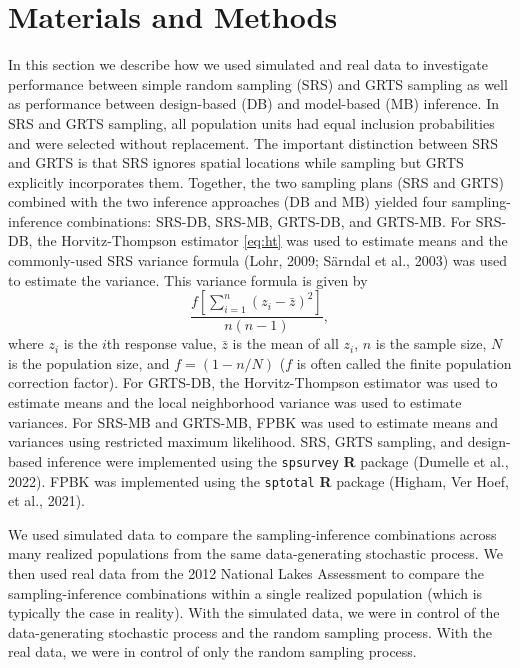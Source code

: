 \documentclass[]{elsarticle} %
\begin{document}
\hypertarget{sec:mm}{%
\section{Materials and Methods}\label{sec:mm}}

In this section we describe how we used simulated and real data to
investigate performance between simple random sampling (SRS) and GRTS
sampling as well as performance between design-based (DB) and
model-based (MB) inference. In SRS and GRTS sampling, all population
units had equal inclusion probabilities and were selected without
replacement. The important distinction between SRS and GRTS is that SRS
ignores spatial locations while sampling but GRTS explicitly
incorporates them. Together, the two sampling plans (SRS and GRTS)
combined with the two inference approaches (DB and MB) yielded four
sampling-inference combinations: SRS-DB, SRS-MB, GRTS-DB, and GRTS-MB.
For SRS-DB, the Horvitz-Thompson estimator \eqref{eq:ht} was used to
estimate means and the commonly-used SRS variance formula (Lohr, 2009;
Särndal et al., 2003) was used to estimate the variance. This variance
formula is given by \begin{equation}\label{equation:srs_var}
 \frac{f[\sum_{i = 1}^n (z_i - \bar{z})^2]}{n(n - 1)},
\end{equation} where \(z_i\) is the \(i\)th response value, \(\bar{z}\)
is the mean of all \(z_i\), \(n\) is the sample size, \(N\) is the
population size, and \(f = (1 - n / N)\) (\(f\) is often called the
finite population correction factor). For GRTS-DB, the Horvitz-Thompson
estimator was used to estimate means and the local neighborhood variance
was used to estimate variances. For SRS-MB and GRTS-MB, FPBK was used to
estimate means and variances using restricted maximum likelihood. SRS,
GRTS sampling, and design-based inference were implemented using the
\texttt{spsurvey} \textbf{\textsf{R}} package (Dumelle et al., 2022).
FPBK was implemented using the \texttt{sptotal} \textbf{\textsf{R}}
package (Higham, Ver Hoef, et al., 2021).

We used simulated data to compare the sampling-inference combinations
across many realized populations from the same data-generating
stochastic process. We then used real data from the 2012 National Lakes
Assessment to compare the sampling-inference combinations within a
single realized population (which is typically the case in reality).
With the simulated data, we were in control of the data-generating
stochastic process and the random sampling process. With the real data,
we were in control of only the random sampling process.
\end{document}
